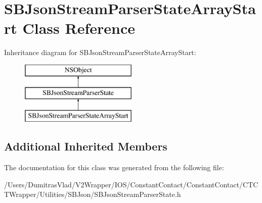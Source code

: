 \hypertarget{interface_s_b_json_stream_parser_state_array_start}{\section{S\-B\-Json\-Stream\-Parser\-State\-Array\-Start Class Reference}
\label{interface_s_b_json_stream_parser_state_array_start}
}
Inheritance diagram for S\-B\-Json\-Stream\-Parser\-State\-Array\-Start\-:\begin{figure}[H]
\begin{center}
\leavevmode
\includegraphics[height=3.000000cm]{interface_s_b_json_stream_parser_state_array_start}
\end{center}
\end{figure}
\subsection*{Additional Inherited Members}


The documentation for this class was generated from the following file\-:\begin{DoxyCompactItemize}
\item 
/\-Users/\-Dumitras\-Vlad/\-V2\-Wrapper/\-I\-O\-S/\-Constant\-Contact/\-Constant\-Contact/\-C\-T\-C\-T\-Wrapper/\-Utilities/\-S\-B\-Json/S\-B\-Json\-Stream\-Parser\-State.\-h\end{DoxyCompactItemize}
